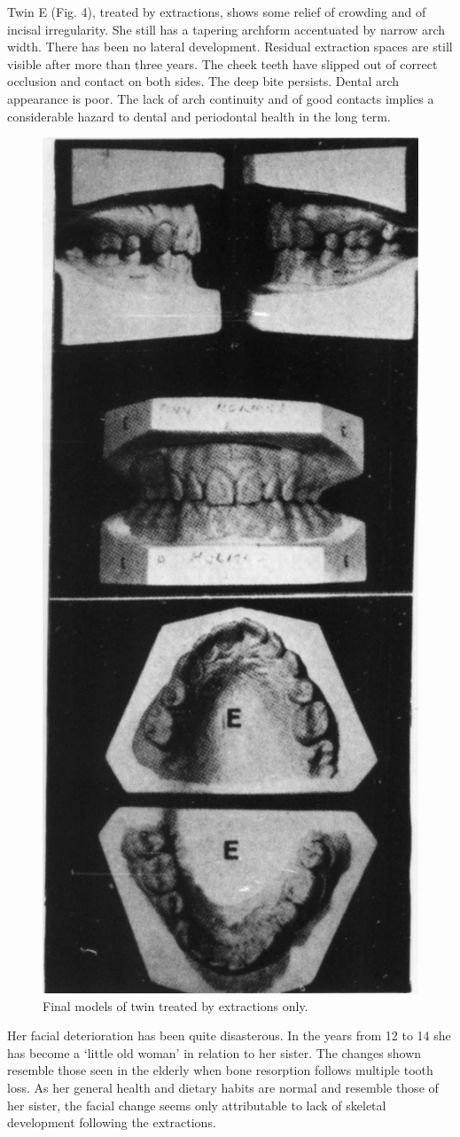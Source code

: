 \documentclass{article}
\begin{document}
Twin E (Fig. 4), treated by extractions, shows some relief of crowding and of incisal irregularity.
She still has a tapering archform accentuated by narrow arch width.
There has been no lateral development.
Residual extraction spaces are still visible after more than three years.
The cheek teeth have slipped out of correct occlusion and contact on both sides.
The deep bite persists.
Dental arch appearance is poor.
The lack of arch continuity and of good contacts implies a considerable hazard to dental and periodontal health in the long term.

\begin{figure}[H]
    \centering
    \includegraphics[width=0.5\linewidth]{fig04.png}
    \caption{Final models of twin treated by extractions only.}
\end{figure}

Her facial deterioration has been quite disasterous.
In the years from 12 to 14 she has become a ‘little old woman’ in relation to her sister.
The changes shown resemble those seen in the elderly when bone resorption follows multiple tooth loss.
As her general health and dietary habits are normal and resemble those of her sister, the facial change seems only attributable to lack of skeletal development following the extractions.
\end{document}
